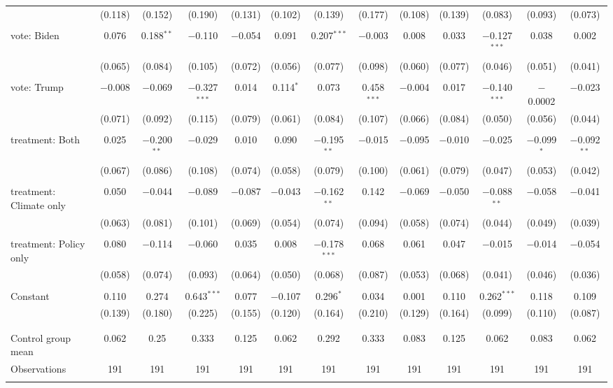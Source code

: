 \begin{tabular}{@{\extracolsep{5pt}}lcccccccccccc}
  & (0.118) & (0.152) & (0.190) & (0.131) & (0.102) & (0.139) & (0.177) & (0.108) & (0.139) & (0.083) & (0.093) & (0.073) \\ 
  & & & & & & & & & & & & \\ 
 vote: Biden & 0.076 & 0.188$^{**}$ & $-$0.110 & $-$0.054 & 0.091 & 0.207$^{***}$ & $-$0.003 & 0.008 & 0.033 & $-$0.127$^{***}$ & 0.038 & 0.002 \\ 
  & (0.065) & (0.084) & (0.105) & (0.072) & (0.056) & (0.077) & (0.098) & (0.060) & (0.077) & (0.046) & (0.051) & (0.041) \\ 
  & & & & & & & & & & & & \\ 
 vote: Trump & $-$0.008 & $-$0.069 & $-$0.327$^{***}$ & 0.014 & 0.114$^{*}$ & 0.073 & 0.458$^{***}$ & $-$0.004 & 0.017 & $-$0.140$^{***}$ & $-$0.0002 & $-$0.023 \\ 
  & (0.071) & (0.092) & (0.115) & (0.079) & (0.061) & (0.084) & (0.107) & (0.066) & (0.084) & (0.050) & (0.056) & (0.044) \\ 
  & & & & & & & & & & & & \\ 
 treatment: Both & 0.025 & $-$0.200$^{**}$ & $-$0.029 & 0.010 & 0.090 & $-$0.195$^{**}$ & $-$0.015 & $-$0.095 & $-$0.010 & $-$0.025 & $-$0.099$^{*}$ & $-$0.092$^{**}$ \\ 
  & (0.067) & (0.086) & (0.108) & (0.074) & (0.058) & (0.079) & (0.100) & (0.061) & (0.079) & (0.047) & (0.053) & (0.042) \\ 
  & & & & & & & & & & & & \\ 
 treatment: Climate only & 0.050 & $-$0.044 & $-$0.089 & $-$0.087 & $-$0.043 & $-$0.162$^{**}$ & 0.142 & $-$0.069 & $-$0.050 & $-$0.088$^{**}$ & $-$0.058 & $-$0.041 \\ 
  & (0.063) & (0.081) & (0.101) & (0.069) & (0.054) & (0.074) & (0.094) & (0.058) & (0.074) & (0.044) & (0.049) & (0.039) \\ 
  & & & & & & & & & & & & \\ 
 treatment: Policy only & 0.080 & $-$0.114 & $-$0.060 & 0.035 & 0.008 & $-$0.178$^{***}$ & 0.068 & 0.061 & 0.047 & $-$0.015 & $-$0.014 & $-$0.054 \\ 
  & (0.058) & (0.074) & (0.093) & (0.064) & (0.050) & (0.068) & (0.087) & (0.053) & (0.068) & (0.041) & (0.046) & (0.036) \\ 
  & & & & & & & & & & & & \\ 
 Constant & 0.110 & 0.274 & 0.643$^{***}$ & 0.077 & $-$0.107 & 0.296$^{*}$ & 0.034 & 0.001 & 0.110 & 0.262$^{***}$ & 0.118 & 0.109 \\ 
  & (0.139) & (0.180) & (0.225) & (0.155) & (0.120) & (0.164) & (0.210) & (0.129) & (0.164) & (0.099) & (0.110) & (0.087) \\ 
  & & & & & & & & & & & & \\ 
\hline \\[-1.8ex] 
Control group mean & 0.062 & 0.25 & 0.333 & 0.125 & 0.062 & 0.292 & 0.333 & 0.083 & 0.125 & 0.062 & 0.083 & 0.062 \\ 
Observations & 191 & 191 & 191 & 191 & 191 & 191 & 191 & 191 & 191 & 191 & 191 & 191 \\ 
\hline 
\hline \\[-1.8ex] 
\end{tabular} 
